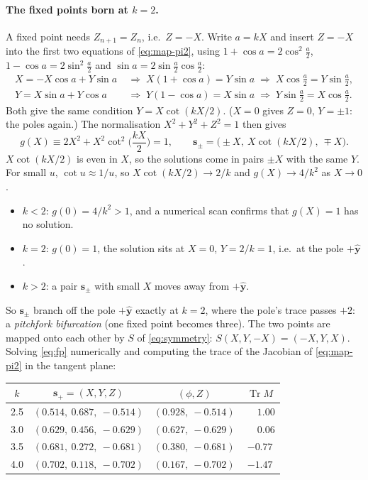 \documentclass[11pt,a4paper]{article}
\newcommand{\vs}{\bm{s}}
\newcommand{\Tr}{\operatorname{Tr}}
\begin{document}
\paragraph{The fixed points born at $k=2$.} A fixed point needs $Z_{n+1} = Z_n$, i.e.\ $Z = -X$. Write $a = kX$ and
insert $Z = -X$ into the first two equations of \eqref{eq:map-pi2}, using $1 + \cos a = 2\cos^2\frac a2$, $1 - \cos a =
2\sin^2\frac a2$ and $\sin a = 2\sin\frac a2\cos\frac a2$:
\begin{align*}
  X = -X\cos a + Y\sin a \;&\Longrightarrow\; X(1+\cos a) = Y\sin a \;\Longrightarrow\; X\cos\tfrac a2 = Y\sin\tfrac a2, \\
  Y = X\sin a + Y\cos a \;&\Longrightarrow\; Y(1-\cos a) = X\sin a \;\Longrightarrow\; Y\sin\tfrac a2 = X\cos\tfrac a2 .
\end{align*}
Both give the same condition $Y = X\cot(kX/2)$. ($X = 0$ gives $Z = 0$, $Y=\pm1$: the poles again.) The normalisation
$X^2 + Y^2 + Z^2 = 1$ then gives
\begin{equation}\label{eq:fp}
  g(X) \equiv 2X^2 + X^2\cot^2\!\Big(\frac{kX}{2}\Big) = 1, \qquad \vs_\pm = \big(\pm X,\ X\cot(kX/2),\ \mp X\big).
\end{equation}
$X\cot(kX/2)$ is even in $X$, so the solutions come in pairs $\pm X$ with the same $Y$. For small $u$, $\cot u \approx
1/u$, so $X\cot(kX/2) \to 2/k$ and $g(X) \to 4/k^2$ as $X\to0$.
\begin{itemize}
  \item $k < 2$: $g(0) = 4/k^2 > 1$, and a numerical scan confirms that $g(X) = 1$ has no solution.
  \item $k = 2$: $g(0) = 1$, the solution sits at $X = 0$, $Y = 2/k = 1$, i.e.\ at the pole $+\hat{\bm y}$.
  \item $k > 2$: a pair $\vs_\pm$ with small $X$ moves away from $+\hat{\bm y}$.
\end{itemize}
So $\vs_\pm$ branch off the pole $+\hat{\bm y}$ exactly at $k = 2$, where the pole's trace passes $+2$: a
\emph{pitchfork bifurcation} (one fixed point becomes three). The two points are mapped onto each other by $S$ of
\eqref{eq:symmetry}: $S(X, Y, -X) = (-X, Y, X)$. Solving \eqref{eq:fp} numerically and computing the trace of the
Jacobian of \eqref{eq:map-pi2} in the tangent plane:

\begin{center}
\begin{tabular}{cccc}
\toprule
$k$ & $\vs_+ = (X,Y,Z)$ & $(\phi, Z)$ & $\Tr M$ \\
\midrule
2.5 & $(0.514,\ 0.687,\ -0.514)$ & $(0.928,\ -0.514)$ & $\phantom{-}1.00$ \\
3.0 & $(0.629,\ 0.456,\ -0.629)$ & $(0.627,\ -0.629)$ & $\phantom{-}0.06$ \\
3.5 & $(0.681,\ 0.272,\ -0.681)$ & $(0.380,\ -0.681)$ & $-0.77$ \\
4.0 & $(0.702,\ 0.118,\ -0.702)$ & $(0.167,\ -0.702)$ & $-1.47$ \\
\bottomrule
\end{tabular}
\end{center}
\end{document}
